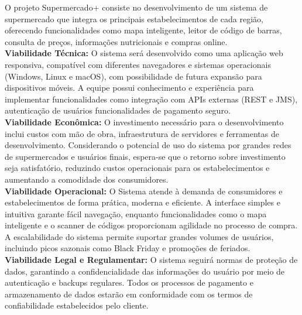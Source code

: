 \hspace{4.5mm}
O projeto Supermercado+ consiste no desenvolvimento de um sistema de supermercado que integra os principais estabelecimentos de cada região, oferecendo funcionalidades como mapa inteligente, leitor de código de barras, consulta de preços, informações nutricionais e compras online.
\\\textbf{Viabilidade Técnica:}
O sistema será desenvolvido como uma aplicação web responsiva, compatível com diferentes navegadores e sistemas operacionais (Windows, Linux e macOS), com possibilidade de futura expansão para dispositivos móveis. A equipe possui conhecimento e experiência para implementar funcionalidades como integração com APIs externas (REST e JMS), autenticação de usuários funcionalidades de pagamento seguro.
\\\textbf{Viabilidade Econômica:}
O investimento necessário para o desenvolvimento inclui custos com mão de obra, infraestrutura de servidores e ferramentas de desenvolvimento. Considerando o potencial de uso do sistema por grandes redes de supermercados e usuários finais, espera-se que o retorno sobre investimento seja satisfatório, reduzindo custos operacionais para os estabelecimentos e aumentando a comodidade dos consumidores.
\\\textbf{Viabilidade Operacional:}
O Sistema atende à demanda de consumidores e estabelecimentos de forma prática, moderna e eficiente. A interface simples e intuitiva garante fácil navegação, enquanto funcionalidades como o mapa inteligente e o scanner de códigos proporcionam agilidade no processo de compra. A escalabilidade do sistema permite suportar grandes volumes de usuários, incluindo picos sazonais como Black Friday e promoções de feriados.
\\\textbf{Viabilidade Legal e Regulamentar:}
O sistema seguirá normas de proteção de dados, garantindo a confidencialidade das informações do usuário por meio de autenticação e backups regulares. Todos os processos de pagamento e armazenamento de dados estarão em conformidade com os termos de confiabilidade estabelecidos pelo cliente.